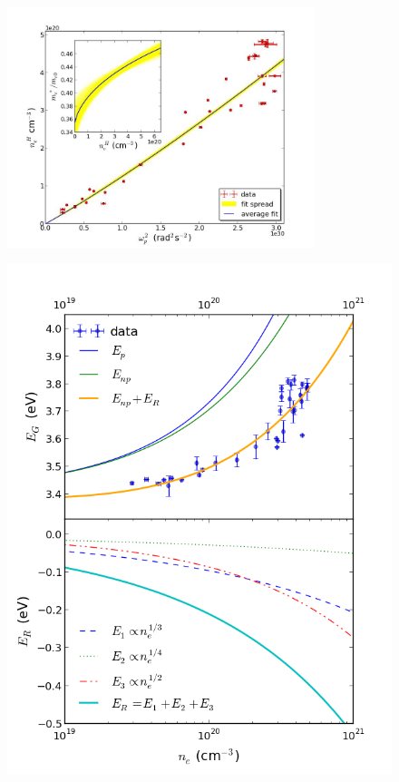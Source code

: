\documentclass[aps,prl,preprint,showpacs,showkeys,linenumbers]{revtex4-1}
\begin{document}
\begin{figure}[p]
\centering
\caption{\label{fig:2}}
\end{figure}

\begin{figure}[p]
\centering
\includegraphics[width = 0.8\textwidth]{figure1c}
\caption{\label{fig:3}}
\end{figure}

\begin{figure}[p]
\includegraphics[scale=0.8]{figure5_b.png}
\caption{\label{fig:4}}
\end{figure}
\end{document}
